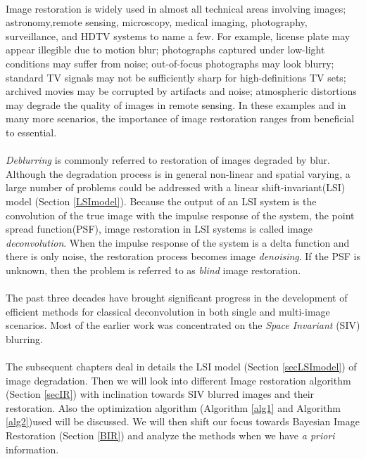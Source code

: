 \documentclass[a4paper]{book}
\begin{document}
	\paragraph*{}Image restoration is widely used in almost all technical areas involving images; astronomy,remote sensing, microscopy, medical imaging, photography, surveillance, and HDTV systems to name a few. For example, license plate may appear illegible due to motion blur; photographs captured under low-light conditions may suffer from noise; out-of-focus photographs may look blurry; standard TV signals may not be sufficiently sharp for high-definitions TV sets; archived movies may be corrupted by artifacts and noise; atmospheric distortions may degrade the quality of images in remote sensing. In these examples and in many more scenarios, the importance of image restoration ranges from beneficial to essential.
	
	\paragraph*{} \textit{Deblurring} is commonly referred to restoration of images degraded by blur. Although the degradation process is in general non-linear and spatial varying, a large number of problems could be addressed with a linear shift-invariant(LSI) model (Section \ref{LSImodel}). Because the output of an LSI system is the convolution of the true image with the impulse response of the system, the point spread function(PSF), image restoration in LSI systems is called image \textit{deconvolution}. When the impulse response of the system is a delta function and there is only noise, the restoration process becomes image \textit{denoising}. If the PSF is unknown, then the problem is referred to as \textit{blind} image restoration.\cite{bookchapt2}
	
	\paragraph*{}The past three decades have brought significant progress in the development of efficient methods for classical deconvolution in both single and multi-image scenarios. Most of the earlier work was concentrated on the \textit{Space Invariant} (SIV) blurring.\cite{bookchapt3} 
	
	\paragraph*{}The subsequent chapters deal in details the LSI model (Section \ref{secLSImodel}) of image degradation. Then we will look into different Image restoration algorithm (Section \ref{secIR}) with inclination towards SIV blurred images and their restoration. Also the optimization algorithm (Algorithm \ref{alg1} and Algorithm \ref{alg2})used will be discussed.
	We will then shift our focus towards Bayesian Image Restoration (Section \ref{BIR}) and analyze the methods when we have \textit{a priori} information.
\end{document}
